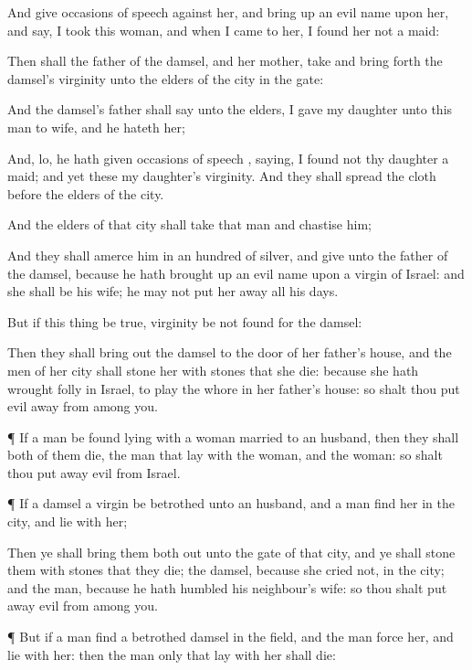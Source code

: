 {And
give
occasions of
speech against her, and bring
up an
evil
name upon her, and
say, I
took this
woman, and when I
came to her, I
found her not a
maid:

Then shall the
father of the
damsel, and her
mother,
take and bring
forth
{} the
damsel’s
virginity unto the
elders of the
city in the
gate:

And the
damsel’s
father shall
say unto the
elders, I
gave my
daughter unto this
man to
wife, and he
hateth her;

And, lo, he hath
given
occasions of
speech
{},
saying, I
found not thy
daughter a
maid; and yet these
{} my
daughter’s
virginity. And they shall
spread the
cloth
before the
elders of the
city.

And the
elders of that
city shall
take that
man and
chastise him;

And they shall
amerce him in an
hundred
{} of
silver, and
give
{} unto the
father of the
damsel, because he hath brought
up an
evil
name upon a
virgin of
Israel: and she shall be his
wife; he
may not put her
away all his
days.

But if this
thing be
true,
{}
virginity be not
found for the
damsel:

Then they shall bring
out the
damsel to the
door of her
father’s
house, and the
men of her
city shall
stone her with
stones that she
die: because she hath
wrought
folly in
Israel, to play the
whore in her
father’s
house: so shalt thou
put
evil
away from
among you.


\par }{\PP {}¶ If a
man be
found
lying with a
woman
married to an
husband, then they shall both of
them
die,
{} the
man that
lay with the
woman, and the
woman: so shalt thou put
away
evil from
Israel.


\par }{\PP {}¶ If a
damsel
{} a
virgin be
betrothed unto an
husband, and a
man
find her in the
city, and
lie with her;

Then ye shall
bring them
both out unto the
gate of that
city, and ye shall
stone them with
stones that they
die; the
damsel,
because she
cried not,
{} in the
city; and the
man,
because he hath
humbled his
neighbour’s
wife: so thou shalt put
away
evil from
among you.


\par }{\PP {}¶ But if a
man
find a
betrothed
damsel in the
field, and the
man
force her, and
lie with her: then the
man only that
lay with her shall
die:

}

